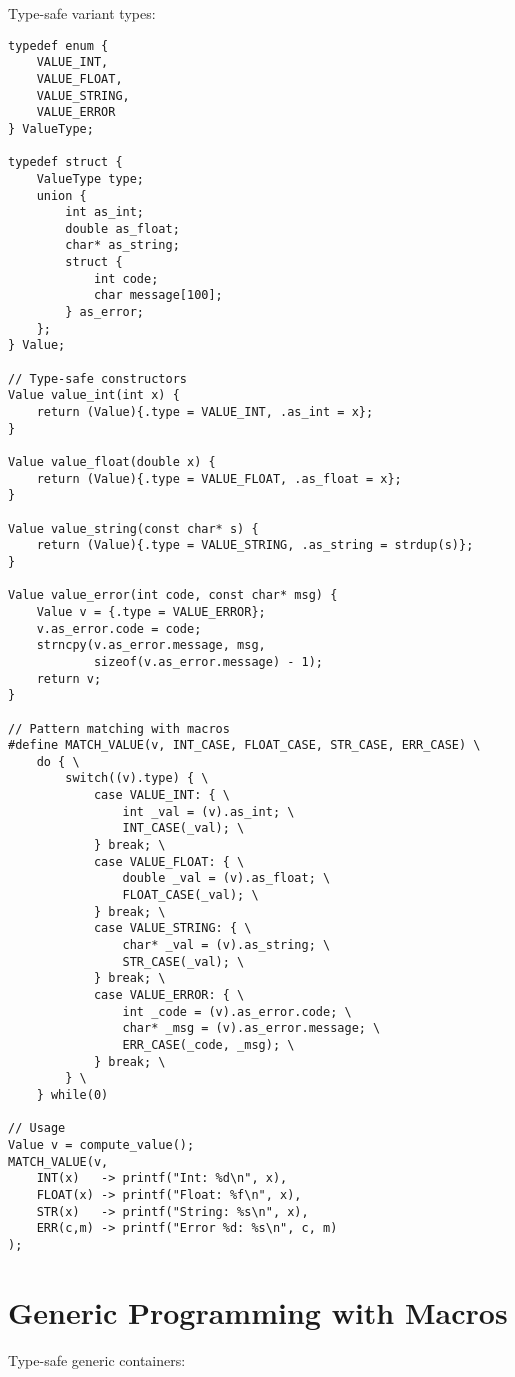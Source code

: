 Type-safe variant types:

\begin{lstlisting}
typedef enum {
    VALUE_INT,
    VALUE_FLOAT,
    VALUE_STRING,
    VALUE_ERROR
} ValueType;

typedef struct {
    ValueType type;
    union {
        int as_int;
        double as_float;
        char* as_string;
        struct {
            int code;
            char message[100];
        } as_error;
    };
} Value;

// Type-safe constructors
Value value_int(int x) {
    return (Value){.type = VALUE_INT, .as_int = x};
}

Value value_float(double x) {
    return (Value){.type = VALUE_FLOAT, .as_float = x};
}

Value value_string(const char* s) {
    return (Value){.type = VALUE_STRING, .as_string = strdup(s)};
}

Value value_error(int code, const char* msg) {
    Value v = {.type = VALUE_ERROR};
    v.as_error.code = code;
    strncpy(v.as_error.message, msg,
            sizeof(v.as_error.message) - 1);
    return v;
}

// Pattern matching with macros
#define MATCH_VALUE(v, INT_CASE, FLOAT_CASE, STR_CASE, ERR_CASE) \
    do { \
        switch((v).type) { \
            case VALUE_INT: { \
                int _val = (v).as_int; \
                INT_CASE(_val); \
            } break; \
            case VALUE_FLOAT: { \
                double _val = (v).as_float; \
                FLOAT_CASE(_val); \
            } break; \
            case VALUE_STRING: { \
                char* _val = (v).as_string; \
                STR_CASE(_val); \
            } break; \
            case VALUE_ERROR: { \
                int _code = (v).as_error.code; \
                char* _msg = (v).as_error.message; \
                ERR_CASE(_code, _msg); \
            } break; \
        } \
    } while(0)

// Usage
Value v = compute_value();
MATCH_VALUE(v,
    INT(x)   -> printf("Int: %d\n", x),
    FLOAT(x) -> printf("Float: %f\n", x),
    STR(x)   -> printf("String: %s\n", x),
    ERR(c,m) -> printf("Error %d: %s\n", c, m)
);
\end{lstlisting}

\section{Generic Programming with Macros}

Type-safe generic containers:

